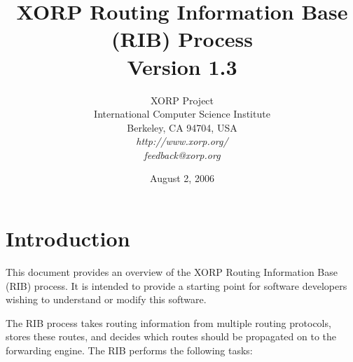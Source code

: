 \documentclass[11pt]{article}
\begin{document}
\title{XORP Routing Information Base (RIB) Process \\
\vspace{1ex}
Version 1.3}
\author{ XORP Project					\\
	 International Computer Science Institute	\\
	 Berkeley, CA 94704, USA			\\
         {\it http://www.xorp.org/}			\\
	 {\it feedback@xorp.org}
}
\date{August 2, 2006}

\maketitle


\section{Introduction}

This document provides an overview of the XORP Routing Information
Base (RIB) process.  It is intended to provide a starting point for
software developers wishing to understand or modify this software.

The RIB process takes routing information from multiple routing
protocols, stores these routes, and decides which routes should be
propagated on to the forwarding engine.  The RIB performs the following
tasks:
\end{document}
